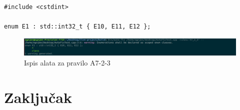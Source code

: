 \documentclass[12pt,oneside]{memoir}
\begin{document}
\begin{lstlisting}[style=customc, caption={Primer koda koji nije napisan u skladu sa pravilom A7-2-3}, label=lst:label16, captionpos=b]
#include <cstdint>

enum E1 : std::int32_t { E10, E11, E12 };

\end{lstlisting}


\begin{figure}[!h]
\begin{center}
\includegraphics[scale=0.3]{A7-2-3.png}
\end{center}
\caption{Ispis alata za pravilo A7-2-3}
\label{fig:A7-2-3}
\end{figure}



\chapter{Zaključak}


\literatura

\backmatter

\begin{biografija}
\end{biografija}
\end{document}
